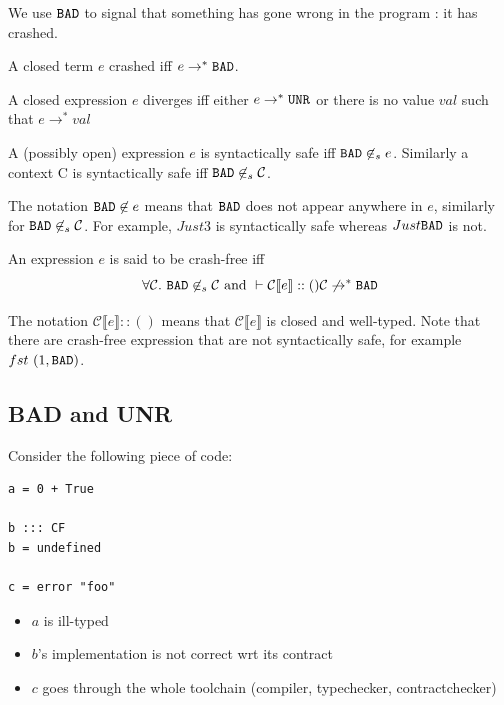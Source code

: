 \documentclass[preprint]{sigplanconf}
\begin{document}
We use $\texttt{BAD}$ to signal that something has gone wrong in the program :
it has crashed.

\begin{definition}[Crash]
A closed term $e$ crashed iff $e \to^* \texttt{BAD}$.
\end{definition}

\begin{definition}[Diverges]
A closed expression $e$ diverges iff either $e \to^* \texttt{UNR}$ or there is
no value $val$ such that $e \to^* val$
\end{definition}

\begin{definition}
A (possibly open) expression $e$ is syntactically safe iff $\texttt{BAD} \not
\in_s e$. Similarly a context \cal C is syntactically safe iff $\texttt{BAD}
\not \in_s \mathcal{C}$.
\end{definition}

The notation $\texttt{BAD} \not \in e$ means that $\texttt{BAD}$ does not appear
anywhere in $e$, similarly for $\texttt{BAD} \not \in_s \mathcal{C}$. For
example, $Just 3$ is syntactically safe whereas $Just \texttt{BAD}$ is not.

\begin{definition}
An expression $e$ is said to be crash-free iff 
$$\forall \mathcal{C}.~\texttt{BAD} \not \in_s \mathcal{C} \mbox{ and } \vdash
\mathcal{C} \llbracket e \rrbracket :: () \mathcal{C} \not \to^* \texttt{BAD}$$
\end{definition}
The notation $\mathcal{C} \llbracket e \rrbracket :: ()$ means that
$\mathcal{C} \llbracket e \rrbracket$ is closed and well-typed.  Note
that there are crash-free expression that are not syntactically safe,
for example $fst~(1,\texttt{BAD})$.

\subsection{BAD and UNR}
Consider the following piece of code:
\begin{verbatim}
a = 0 + True

b ::: CF
b = undefined

c = error "foo"
\end{verbatim}


\begin{itemize}
\item $a$ is ill-typed
\item $b$'s implementation is not correct wrt its contract
\item $c$ goes through the whole toolchain (compiler, typechecker, contractchecker)
\end{itemize}
\end{document}
